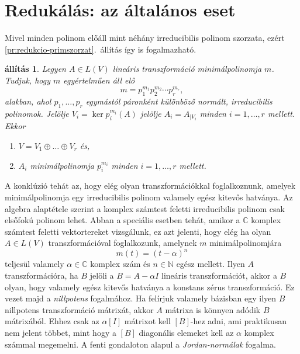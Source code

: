 \documentclass[9pt, a4paper, showtrims]{memoir}
\theoremstyle{plain}
\newtheorem{proposition}{állítás}[chapter]
\theoremstyle{remark}
\theoremstyle{definition}
\begin{document}
    \section{Redukálás: az általános eset}
    Mivel minden polinom előáll mint néhány irreducibilis polinom szorzata,
    ezért \ref{pr:redukcio-primszorzat}.~állítás így is fogalmazható.
    \begin{proposition}\label{pr:redukcio-primfelbontas}
        Legyen $A\in L\left( V \right)$ lineáris transzformáció minimálpolinomja
        $m$.
        Tudjuk, hogy $m$ egyértelműen áll elő
        \[
            m
            =
            p_1^{m_1}p_2^{m_2}\cdots p_r^{m_r},
        \]
        alakban, 
        ahol $p_1,\dots,p_r$ egymástól páronként különböző normált, irreducibilis polinomok.
        Jelölje $V_i=\ker p_i^{m_i}\left( A \right)$ 
        jelölje $A_i=A_{|V_i}$ minden $i=1,\dots,r$ mellett.
        Ekkor
        \begin{enumerate}
            \item $V=V_1\oplus\dots\oplus V_r$ és,
            \item $A_i$ minimálpolinomja $p_i^{m_i}$ minden $i=1,\dots,r$ mellett.\qedhere
        \end{enumerate}
    \end{proposition}
    A konklúzió tehát az, 
    hogy elég olyan transzformációkkal foglalkoznunk,
    amelyek minimálpolinomja egy irreducibilis polinom valamely egész kitevős hatványa.
    Az algebra alaptétele szerint a komplex számtest feletti irreducibilis polinom csak elsőfokú polinom lehet.
    Abban a speciális esetben tehát,
    amikor a $\mathbb{C}$ komplex számtest feletti vektortereket vizsgálunk,
    ez azt jelenti, 
    hogy elég ha olyan $A\in L\left( V \right)$ transzformációval foglalkozunk, 
    amelynek $m$ minimálpolinomjára
    \[
        m\left( t \right)=(t-\alpha)^n
    \]
    teljesül valamely $\alpha\in\mathbb{C}$ komplex szám és $n\in\mathbb{N}$ egész mellett.
    Ilyen $A$ transzformációra, ha $B$ jelöli a $B=A-\alpha I$ lineáris transzformációt,
    akkor a $B$ olyan, 
    hogy valamely egész kitevős hatványa a konstans zérus transzformáció.
    Ez vezet majd a \emph{nillpotens} fogalmához.
    Ha felírjuk valamely bázisban egy ilyen $B$ nillpotens transzformáció mátrixát,
    akkor $A$ mátrixa is könnyen adódik $B$ mátrixából.
    Ehhez csak az $\alpha [I]$ mátrixot kell $\left[ B \right]$-hez adni,
    ami praktikusan nem jelent többet, 
    mint hogy a $\left[ B \right]$ diagonális elemeket kell az $\alpha$ komplex számmal megemelni.
    A fenti gondaloton alapul a \emph{Jordan-normálak} fogalma. 
\end{document}
